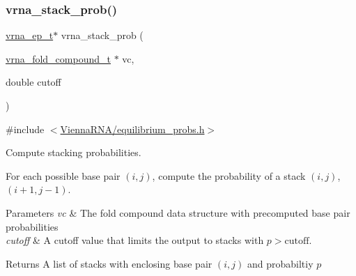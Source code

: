 \subsubsection{\texorpdfstring{vrna\+\_\+stack\+\_\+prob()}{vrna\_stack\_prob()}}
{\footnotesize\ttfamily \hyperlink{group__struct__utils__plist_gab9ac98ab55ded9fb90043b024b915aca}{vrna\+\_\+ep\+\_\+t}$\ast$ vrna\+\_\+stack\+\_\+prob (\begin{DoxyParamCaption}\item[{\hyperlink{group__fold__compound_ga1b0cef17fd40466cef5968eaeeff6166}{vrna\+\_\+fold\+\_\+compound\+\_\+t} $\ast$}]{vc,  }\item[{double}]{cutoff }\end{DoxyParamCaption})}



{\ttfamily \#include $<$\hyperlink{equilibrium__probs_8h}{Vienna\+R\+N\+A/equilibrium\+\_\+probs.\+h}$>$}



Compute stacking probabilities. 

For each possible base pair $(i,j)$, compute the probability of a stack $(i,j)$, $(i+1, j-1)$.


\begin{DoxyParams}{Parameters}
{\em vc} & The fold compound data structure with precomputed base pair probabilities \\
\hline
{\em cutoff} & A cutoff value that limits the output to stacks with $ p > \textrm{cutoff} $. \\
\hline
\end{DoxyParams}
\begin{DoxyReturn}{Returns}
A list of stacks with enclosing base pair $(i,j)$ and probabiltiy $ p $ 
\end{DoxyReturn}
\mbox{\label{group__part__func__global_gaa1e39e73afb51fbaf4ae38f0c066c46b}} 
